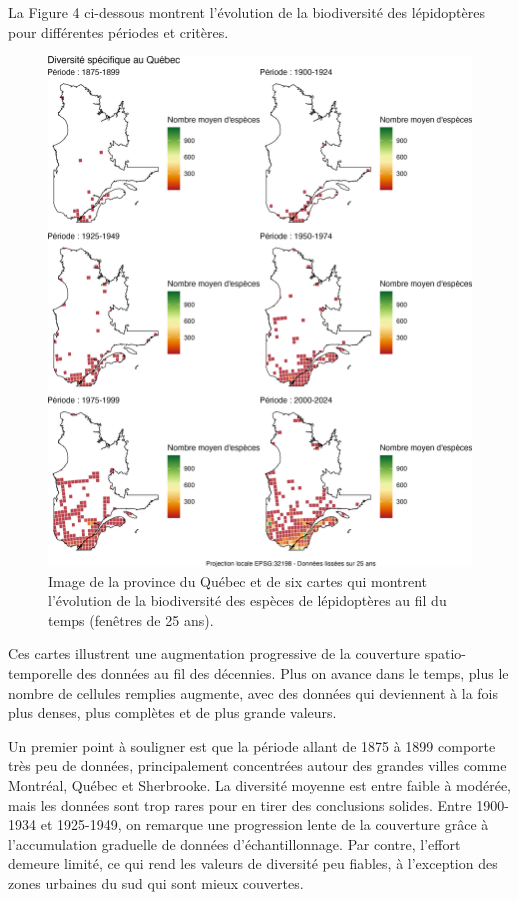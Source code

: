 \documentclass[9pt,twocolumn,twoside,]{pnas-new}
\begin{document}
La Figure 4 ci-dessous montrent l'évolution de la biodiversité des
lépidoptères pour différentes périodes et critères.

\begin{figure}

\includegraphics[width=1\linewidth]{../Figures_analyse/cartes_combinees} \hfill{}

\caption{Image de la province du Québec et de six cartes qui montrent l'évolution de la biodiversité des espèces de lépidoptères au fil du temps (fenêtres de 25 ans).}\label{fig:fig_cartes_combinees, fullpage-figure}
\end{figure}

Ces cartes illustrent une augmentation progressive de la couverture
spatio-temporelle des données au fil des décennies. Plus on avance dans
le temps, plus le nombre de cellules remplies augmente, avec des données
qui deviennent à la fois plus denses, plus complètes et de plus grande
valeurs.

Un premier point à souligner est que la période allant de 1875 à 1899
comporte très peu de données, principalement concentrées autour des
grandes villes comme Montréal, Québec et Sherbrooke. La diversité
moyenne est entre faible à modérée, mais les données sont trop rares
pour en tirer des conclusions solides. Entre 1900-1934 et 1925-1949, on
remarque une progression lente de la couverture grâce à l'accumulation
graduelle de données d'échantillonnage. Par contre, l'effort demeure
limité, ce qui rend les valeurs de diversité peu fiables, à l'exception
des zones urbaines du sud qui sont mieux couvertes.
\end{document}
